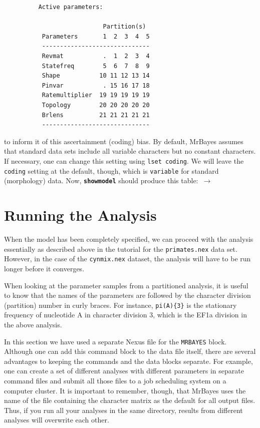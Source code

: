 \documentclass[12pt]{book}
\newcommand{\ttt}[1]{\texttt{#1}}
\newcommand{\tb}[1]{\ttt{\textbf{#1}}}
\begin{document}
\begin{figure}\singlespacing\footnotesize\vspace{-4mm}
\begin{verbatim}
    Active parameters:
 
                      Partition(s)
     Parameters       1  2  3  4  5
     ------------------------------
     Revmat           .  1  2  3  4
     Statefreq        5  6  7  8  9
     Shape           10 11 12 13 14
     Pinvar           . 15 16 17 18
     Ratemultiplier  19 19 19 19 19
     Topology        20 20 20 20 20
     Brlens          21 21 21 21 21
     ------------------------------
\end{verbatim}\end{figure}

\vspace{-2mm} to inform it of this ascertainment (coding) bias. By default, MrBayes assumes that standard 
data sets include all variable characters but no constant characters. If necessary, one can change this 
setting using \texttt{lset coding}. We will leave the \texttt{coding} setting at the default, though, which 
is \texttt{variable} for standard (morphology) data. Now, \tb{showmodel} should produce this table:~$\rightarrow$

\clearpage 

\section{Running the Analysis}

When the model has been completely specified, we can proceed with the analysis essentially as
described above in the tutorial for the \texttt{primates.nex} data set. However, in the case of the
\texttt{cynmix.nex} dataset, the analysis will have to be run longer before it converges.

When looking at the parameter samples from a partitioned analysis, it is useful to know that the
names of the parameters are followed by the character division (partition) number in curly braces.
For instance, \texttt{pi(A)\{3\}} is the stationary frequency of nucleotide A in character division 3,
which is the EF1a division in the above analysis.

In this section we have used a separate Nexus file for the \texttt{MRBAYES} block. Although one can
add this command block to the data file itself, there are several advantages to keeping the
commands and the data blocks separate. For example, one can create a set of different analyses with
different parameters in separate command files and submit all those files to a job scheduling
system on a computer cluster. It is important to remember, though, that MrBayes uses the name of
the file containing the character matrix as the default for all output files. Thus, if you run all
your analyses in the same directory, results from different analyses will overwrite each other.
\end{document}
